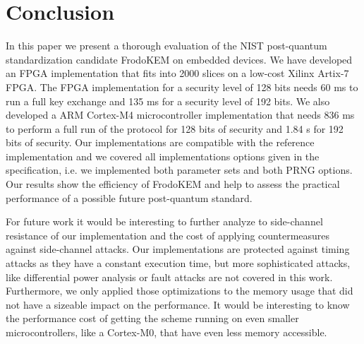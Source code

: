 \section{Conclusion}
In this paper we present a thorough evaluation of the NIST post-quantum standardization candidate \textsf{FrodoKEM}  on embedded devices. We have developed an FPGA implementation that fits into 2000 slices on a low-cost Xilinx Artix-7 FPGA. The FPGA implementation for a security level of 128 bits needs 60 ms to run a full key exchange and 135 ms for a security level of 192 bits. We also developed a ARM Cortex-M4 microcontroller implementation that needs 836 ms to perform a full run of the protocol for 128 bits of security and 1.84 s for 192 bits of security. Our implementations are compatible with the reference implementation and we covered all implementations options given in the specification, i.e. we implemented both parameter sets and both PRNG options. Our results show the efficiency of \textsf{FrodoKEM} and help to assess the practical performance of a possible future post-quantum standard.

For future work it would be interesting to further analyze to side-channel resistance of our implementation and the cost of applying countermeasures against side-channel attacks. Our implementations are protected against timing attacks as they have a constant execution time, but more sophisticated attacks, like differential power analysis or fault attacks are not covered in this work. Furthermore, we only applied those optimizations to the memory usage that did not have a sizeable impact on the performance. It would be interesting to know the performance cost of getting the scheme running on even smaller microcontrollers, like a Cortex-M0, that have even less memory accessible.